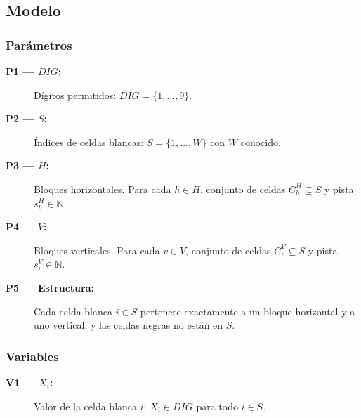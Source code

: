 
\subsection{Modelo}\label{sec:02-kakuro-modelo}

\subsubsection*{Parámetros}
\begin{description}
  \item[\textbf{P1 — \(DIG\):}] Dígitos permitidos: \(DIG=\{1,\dots,9\}\).
  \item[\textbf{P2 — \(S\):}] Índices de celdas blancas: \(S=\{1,\dots,W\}\) con \(W\) conocido.
  \item[\textbf{P3 — \(H\):}] Bloques horizontales. Para cada \(h\in H\), conjunto de celdas \(C^H_h\subseteq S\) y pista \(s^H_h\in\mathbb{N}\).
  \item[\textbf{P4 — \(V\):}] Bloques verticales. Para cada \(v\in V\), conjunto de celdas \(C^V_v\subseteq S\) y pista \(s^V_v\in\mathbb{N}\).
  \item[\textbf{P5 — Estructura:}] Cada celda blanca \(i\in S\) pertenece exactamente a un bloque horizontal y a uno vertical, y las celdas negras no están en \(S\).
\end{description}

\subsubsection*{Variables}
\begin{description}
  \item[\textbf{V1 — \(X_i\):}] Valor de la celda blanca \(i\): \(X_i\in DIG\) para todo \(i\in S\).
\end{description}

